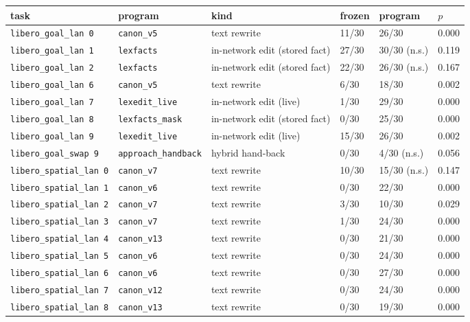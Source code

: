\begin{table}[h]\centering\small
\begin{tabular}{llllll}
\toprule
task & program & kind & frozen & program & $p$ \\
\midrule
\texttt{libero\_goal\_lan 0} & \texttt{canon\_v5} & text rewrite & 11/30 & 26/30 & 0.000 \\
\texttt{libero\_goal\_lan 1} & \texttt{lexfacts} & in-network edit (stored fact) & 27/30 & 30/30 (n.s.) & 0.119 \\
\texttt{libero\_goal\_lan 2} & \texttt{lexfacts} & in-network edit (stored fact) & 22/30 & 26/30 (n.s.) & 0.167 \\
\texttt{libero\_goal\_lan 6} & \texttt{canon\_v5} & text rewrite & 6/30 & 18/30 & 0.002 \\
\texttt{libero\_goal\_lan 7} & \texttt{lexedit\_live} & in-network edit (live) & 1/30 & 29/30 & 0.000 \\
\texttt{libero\_goal\_lan 8} & \texttt{lexfacts\_mask} & in-network edit (stored fact) & 0/30 & 25/30 & 0.000 \\
\texttt{libero\_goal\_lan 9} & \texttt{lexedit\_live} & in-network edit (live) & 15/30 & 26/30 & 0.002 \\
\texttt{libero\_goal\_swap 9} & \texttt{approach\_handback} & hybrid hand-back & 0/30 & 4/30 (n.s.) & 0.056 \\
\texttt{libero\_spatial\_lan 0} & \texttt{canon\_v7} & text rewrite & 10/30 & 15/30 (n.s.) & 0.147 \\
\texttt{libero\_spatial\_lan 1} & \texttt{canon\_v6} & text rewrite & 0/30 & 22/30 & 0.000 \\
\texttt{libero\_spatial\_lan 2} & \texttt{canon\_v7} & text rewrite & 3/30 & 10/30 & 0.029 \\
\texttt{libero\_spatial\_lan 3} & \texttt{canon\_v7} & text rewrite & 1/30 & 24/30 & 0.000 \\
\texttt{libero\_spatial\_lan 4} & \texttt{canon\_v13} & text rewrite & 0/30 & 21/30 & 0.000 \\
\texttt{libero\_spatial\_lan 5} & \texttt{canon\_v6} & text rewrite & 0/30 & 24/30 & 0.000 \\
\texttt{libero\_spatial\_lan 6} & \texttt{canon\_v6} & text rewrite & 0/30 & 27/30 & 0.000 \\
\texttt{libero\_spatial\_lan 7} & \texttt{canon\_v12} & text rewrite & 0/30 & 24/30 & 0.000 \\
\texttt{libero\_spatial\_lan 8} & \texttt{canon\_v13} & text rewrite & 0/30 & 19/30 & 0.000 \\

\end{tabular}
\end{table}
